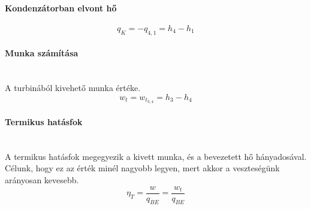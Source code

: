 \paragraph{Kondenzátorban elvont hő}
	\begin{equation}
		q_K = - q_{4,1} = h_4 - h_1
	\end{equation}
\paragraph{Munka számítása}\mbox{}\\
A turbinából kivehető munka értéke.
	\begin{equation}
		w_t = w_{t_{3,4}} = h_3-h_4
	\end{equation}
\paragraph{Termikus hatásfok}\mbox{}\\
A termikus hatásfok megegyezik a kivett munka, és a bevezetett hő hányadosával. Célunk, hogy ez az érték minél nagyobb legyen, mert akkor a veszteségünk arányosan kevesebb.
	\begin{equation}
		\eta_T = \frac{w}{q_{BE}} = \frac{w_t}{q_{BE}}
	\end{equation}